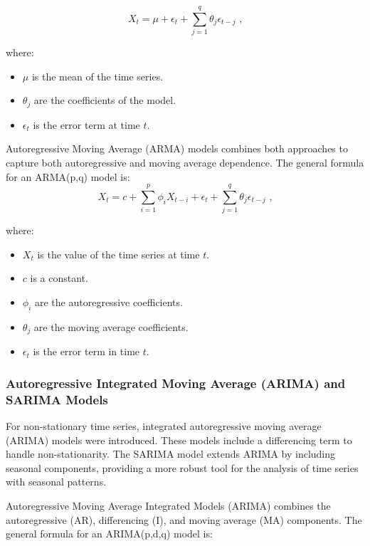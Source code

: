 \begin{equation}
X_t = \mu + \epsilon_t + \sum_{j=1}^{q} \theta_j \epsilon_{t-j} \text{ ,}
\end{equation}

where:
\begin{itemize}
    \item \( \mu \) is the mean of the time series.
    \item \( \theta_j \) are the coefficients of the model.
    \item \( \epsilon_t \) is the error term at time \( t \).
\end{itemize}

Autoregressive Moving Average (ARMA) models combines both approaches to capture both autoregressive and moving average dependence. The general formula for an ARMA(p,q) model is:
\begin{equation}
X_t = c + \sum_{i=1}^{p} \phi_i X_{t-i} + \epsilon_t + \sum_{j=1}^{q} \theta_j \epsilon_{t-j} \text{ ,}
\end{equation}

where:
\begin{itemize}
    \item \( X_t \) is the value of the time series at time \( t \).
    \item \( c \) is a constant.
    \item \( \phi_i \) are the autoregressive coefficients.
    \item \( \theta_j \) are the moving average coefficients.
    \item \( \epsilon_t \) is the error term in time \( t \).
\end{itemize}
\vspace{10pt}

\subsubsection{Autoregressive Integrated Moving Average (ARIMA) and SARIMA Models}

For non-stationary time series, integrated autoregressive moving average (ARIMA) models were introduced. These models include a differencing term to handle non-stationarity. The SARIMA model extends ARIMA by including seasonal components, providing a more robust tool for the analysis of time series with seasonal patterns.

Autoregressive Moving Average Integrated Models (ARIMA) combines the autoregressive (AR), differencing (I), and moving average (MA) components. The general formula for an ARIMA(p,d,q) model is:

